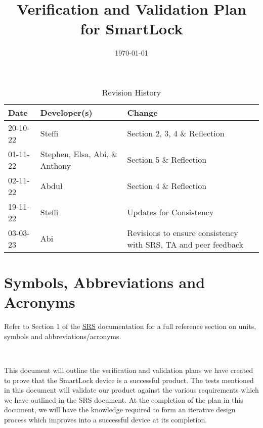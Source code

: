 \documentclass[12pt, titlepage]{article}
\title{Verification and Validation Plan for SmartLock\\\progname}
\author{\authname}
\date{\today}
\begin{document}
	


\maketitle

\newpage


\begin{table}[hp]
\caption{Revision History} \label{TblRevisionHistory}
\begin{tabularx}{\textwidth}{llX}
\toprule
\textbf{Date} & \textbf{Developer(s)} & \textbf{Change}\\
\midrule
20-10-22 & Steffi & Section 2, 3, 4 \& Reflection\\
01-11-22 & Stephen, Elsa, Abi, \& Anthony & Section 5 \& Reflection\\
02-11-22 & Abdul & Section 4 \& Reflection\\
19-11-22 & Steffi & Updates for Consistency\\
03-03-23 & Abi & Revisions to ensure consistency with SRS, TA and peer feedback\\
\bottomrule
\end{tabularx}
\end{table}

\newpage

\tableofcontents

\listoftables


\newpage


\section{Symbols, Abbreviations and Acronyms}

Refer to Section 1 of the \href{https://github.com/NevoAbigail/Capstone/blob/main/docs/SRS/SRS.pdf}{SRS} documentation for a full reference section on units, symbols and abbreviations/acronyms.

\-\

This document will outline the verification and validation plans we have created to prove that the SmartLock device is a successful product. The tests mentioned in this document will validate our product against the various requirements which we have outlined in the SRS document. At the completion of the plan in this document, we will have the knowledge required to form an iterative design process which improves into a successful device at its completion. 
\end{document}
